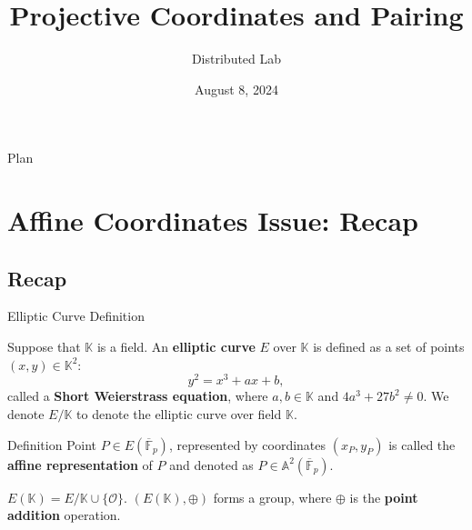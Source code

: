 \documentclass[xcolor={usenames,dvipsnames}]{beamer}
\title[Projective Space and Pairing]{\textbf{Projective Coordinates and Pairing}}
\author{Distributed Lab}
\date{August 8, 2024}
\begin{document}
	\frame {
		\titlepage
	}
 
	\begin{frame}{Plan}
        \tableofcontents
    \end{frame}

	\section{Affine Coordinates Issue: Recap}

    \subsection{Recap}
    \begin{frame}{Elliptic Curve Definition}
        \begin{definition}
            Suppose that $\mathbb{K}$ is a field. An \textbf{elliptic curve} $E$ over $\mathbb{K}$ is defined as a set of points $(x,y) \in \mathbb{K}^2$:
            \begin{equation*}
                y^2 = x^3+ax+b,
            \end{equation*}
            called a \textbf{Short Weierstrass equation}, where $a,b \in \mathbb{K}$ and $4a^3+27b^2 \neq 0$. We denote $E/\mathbb{K}$ to denote the elliptic curve over field $\mathbb{K}$.
        \end{definition}

        \pause\begin{block}{Definition}
            Point $P \in E(\overline{\mathbb{F}}_p)$, represented by coordinates $(x_P,y_P)$ is called the \textbf{affine representation} of $P$ and denoted as $P \in \mathbb{A}^2(\overline{\mathbb{F}}_p)$.
        \end{block}

        \pause\begin{definition}
            $E(\mathbb{K}) = E/\mathbb{K} \cup \{\mathcal{O}\}$. $(E(\mathbb{K}), \oplus)$ forms a group, where $\oplus$ is the \textbf{point addition} operation.
        \end{definition}
    \end{frame}
\end{document}

